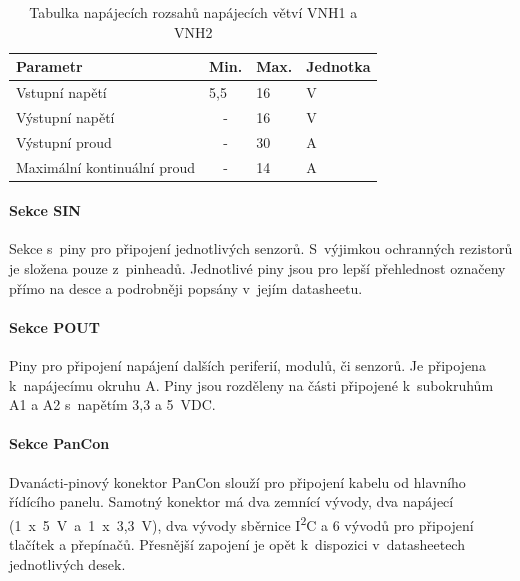 \begin{table}[h]
    \centering
    \begin{tabular}{llll}
        \hline
        \multicolumn{1}{|l|}{\textbf{Parametr}}           & \multicolumn{1}{l|}{\textbf{Min.}} & \multicolumn{1}{l|}{\textbf{Max.}} & \multicolumn{1}{l|}{\textbf{Jednotka}} \\ \hline
        \multicolumn{1}{|l|}{Vstupní napětí}              & \multicolumn{1}{l|}{5,5}           & \multicolumn{1}{l|}{16}            & \multicolumn{1}{l|}{V}                 \\ \hline
        \multicolumn{1}{|l|}{Výstupní napětí}             & \multicolumn{1}{c|}{-}             & \multicolumn{1}{l|}{16}            & \multicolumn{1}{l|}{V}                 \\ \hline
        \multicolumn{1}{|l|}{Výstupní proud}              & \multicolumn{1}{c|}{-}             & \multicolumn{1}{l|}{30}            & \multicolumn{1}{l|}{A}                 \\ \hline
        \multicolumn{1}{|l|}{Maximální kontinuální proud} & \multicolumn{1}{c|}{-}             & \multicolumn{1}{l|}{14}            & \multicolumn{1}{l|}{A}                 \\ \hline
    \end{tabular}
    \caption{Tabulka napájecích rozsahů napájecích větví VNH1 a VNH2}
    \label{fig:powerSourceCharsVNH}
\end{table}

\paragraph{Sekce SIN}
Sekce s~piny pro připojení jednotlivých senzorů. 
S~výjimkou ochranných rezistorů je složena pouze z~pinheadů.
Jednotlivé piny jsou pro lepší přehlednost označeny přímo na desce a podrobněji popsány v~jejím datasheetu. 

\paragraph{Sekce POUT} 
Piny pro připojení napájení dalších periferií, modulů, či senzorů.
Je připojena k~napájecímu okruhu A.
Piny jsou rozděleny na části připojené k~subokruhům A1 a A2 s~napětím 3,3 a 5~VDC.

\paragraph{Sekce PanCon}
Dvanácti-pinový konektor PanCon slouží pro připojení kabelu od hlavního řídícího panelu. 
Samotný konektor má dva zemnící vývody, dva napájecí (1~x~5~V~a~1~x~3,3~V), dva vývody sběrnice I\textsuperscript{2}C a 6 vývodů pro připojení tlačítek a přepínačů.
Přesnější zapojení je opět k~dispozici v~datasheetech jednotlivých desek.

